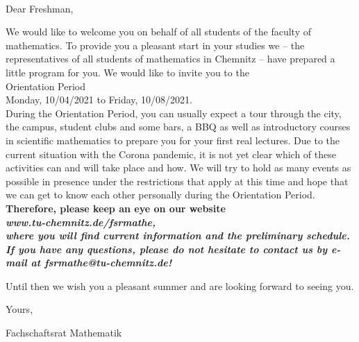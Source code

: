 \documentclass[nkz,einrichtung,usemycontact]{tucletter2019}
\begin{document}
	
\begin{letter}{%
\, \\
}

\opening{Dear Freshman,}

We would like to welcome you on behalf of all students of the faculty of mathematics. To provide you a pleasant start in your studies we – the representatives of all students of mathematics in Chemnitz – have prepared a little program for you. We would like to invite you to the\\[10pt]

\hspace*{\fill} \Large Orientation Period \hspace*{\fill} \\
\hspace*{\fill} Monday, 10/04/2021 to Friday, 10/08/2021. \normalsize \hspace*{\fill} \\[12pt]

During the Orientation Period, you can usually expect a tour through the city, the campus, student clubs and some bars, a BBQ as well as introductory courses in scientific mathematics to prepare you for your first real lectures. Due to the current situation with the Corona pandemic, it is not yet clear which of these activities can and will take place and how. We will try to hold as many events as possible in presence under the restrictions that apply at this time and hope that we can get to know each other personally during the Orientation Period. \\[10pt]


\bfseries Therefore, please keep an eye on our website\\[6pt]
\hspace*{\fill} \Large \itshape\textbf{www.tu-chemnitz.de/fsrmathe,} \upshape \normalsize \hspace*{\fill} \\[6pt]
where you will find current information and the preliminary schedule. \mdseries \\[12pt]


If you have any questions, please do not hesitate to contact us by e-mail at \itshape\textbf{fsrmathe@tu-chemnitz.de}\upshape!

Until then we wish you a pleasant summer and are looking forward to seeing you.

Yours,

Fachschaftsrat Mathematik

\end{letter}
\end{document}

